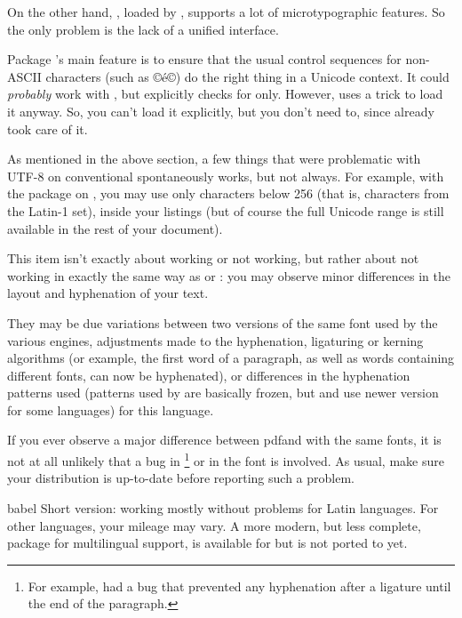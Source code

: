 \documentclass{lltxdoc}
\begin{document}
On the other hand, , loaded by , supports a lot of
microtypographic features. So the only problem is the lack of a unified
interface.

Package 's main feature is to ensure that the usual control
sequences for non-ASCII characters (such as ©\'e©) do the right thing in a
Unicode context. It could \emph{probably} work with \luatex, but explicitly
checks for \xetex only. However,  uses a trick to load it anyway.
So, you can't load it explicitly, but you don't need to, since 
already took care of it.

As mentioned in the above section, a few things that were problematic with
UTF-8 on conventional \latex spontaneously works, but not always. For example,
with the  package on \lualatex, you may use only characters below
256 (that is, characters from the Latin-1 set), inside your listings (but of
course the full Unicode range is still available in the rest of your
document).

This item isn't exactly about working or not working, but rather about not
working in exactly the same way as \pdftex or \xetex: you may observe minor
differences in the layout and hyphenation of your text.

They may be due variations between two versions of the same font used by the
various engines, adjustments made to the hyphenation, ligaturing or kerning
algorithms (or example, the first word of a paragraph, as well as words
containing different fonts, can now be hyphenated), or differences in the
hyphenation patterns used (patterns used by \pdftex are basically frozen, but
\luatex and \xetex use newer version for some languages) for this language.

If you ever observe a major difference between pdf\latex and \lualatex with
the same fonts, it is not at all unlikely that a bug in \luatex\footnote{For
  example,  had a bug that prevented any hyphenation after a
  \code{-{}-{}-} ligature until the end of the paragraph.} or in the font is
involved. As usual, make sure your distribution is up-to-date before reporting
such a problem.

\par{babel}
Short version: working mostly without problems for Latin languages. For other
languages, your mileage may vary. A more modern, but less complete, package
for multilingual support,  is available for \xelatex but is
not ported to \lualatex yet.
\end{document}
